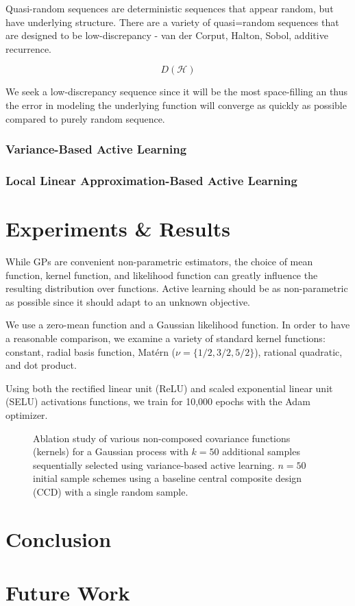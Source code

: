 \documentclass[conference]{IEEEtran}
\begin{document}
	Quasi-random sequences are deterministic sequences that appear random, but have underlying structure. There are a variety of quasi=random sequences that are designed to be low-discrepancy - van der Corput, Halton, Sobol, additive recurrence.
	
	$$D(\mathcal{H})$$
	
	We seek a low-discrepancy sequence since it will be the most space-filling an thus the error in modeling the underlying function will converge as quickly as possible compared to purely random sequence.
	
	
	\subsubsection{Variance-Based Active Learning}
	
	\subsubsection{Local Linear Approximation-Based Active Learning}
	
	\section{Experiments \& Results}
	\label{sec:experiments-results}
	
	While GPs are convenient non-parametric estimators, the choice of mean function, kernel function, and likelihood function can greatly influence the resulting distribution over functions. Active learning should be as non-parametric as possible since it should adapt to an unknown objective.
	
	We use a zero-mean function and a Gaussian likelihood function. In order to have a reasonable comparison, we examine a variety of standard kernel functions: constant, radial basis function, Mat\'ern ($\nu = \{1/2, 3/2, 5/2\}$), rational quadratic, and dot product. 
	
	Using both the rectified linear unit (ReLU) and scaled exponential linear unit (SELU) activations functions, we train for 10,000 epochs with the Adam optimizer.
	
	\begin{figure}[h]
		\centering
		\caption{Ablation study of various non-composed covariance functions (kernels) for a Gaussian process with $k=50$ additional samples sequentially selected using variance-based active learning. $n=50$ initial sample schemes using a baseline central composite design (CCD) with a single random sample.}
	\end{figure}
	
	\section{Conclusion}
	\label{sec:conclusion}
	
	
	\section{Future Work}
	\label{sec:future-work}
	
	
	
	
	
	
	
\end{document}
